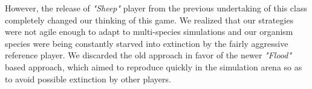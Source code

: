 However, the release of {\em "Sheep"} player from the previous 
undertaking of this class completely changed our thinking of this game. 
We realized that our strategies were not agile enough to adapt to 
multi-species simulations and our organism species were being constantly 
starved into extinction by the fairly aggressive reference player. 
We discarded the old approach in favor of the newer {\em "Flood"} based 
approach, which aimed to reproduce quickly in the simulation arena so as 
to avoid possible extinction by other players. 

